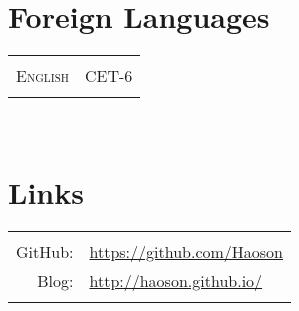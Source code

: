\documentclass[10pt]{article} %
\begin{document}
\begin{minipage}[t]{0.32\textwidth}

\section{Foreign Languages} 

\begin{tabular}{rl}
& \\
\textsc{English}
& CET-6 \\
& \\
\end{tabular}\\[10pt]

\section{Links} 

\begin{tabular}{rl}
& \\
{GitHub:} &  \url{https://github.com/Haoson}\\
{Blog:} & \url{http://haoson.github.io/}\\
& \\
\end{tabular}\\[10pt]


\end{minipage} %
\end{document}
